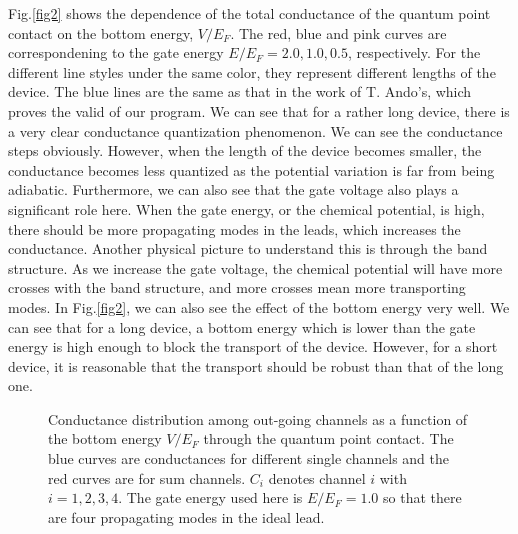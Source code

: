 \documentclass[journal]{IEEEtran}
\begin{document}
Fig.\ref{fig2} shows the dependence of the total conductance of the quantum point contact on the bottom energy,
$V/E_F$. The red, blue and pink curves are correspondening to the gate energy $E/E_F=2.0, 1.0, 0.5$, respectively. For
the different line styles under the same color, they represent different lengths of the device. The blue lines are the
same as that in the work of T. Ando's, which proves the valid of our program. We can see that for a rather long device,
there is a very clear conductance quantization phenomenon. We can see the conductance steps obviously. However, when the
length of the device becomes smaller, the conductance becomes less quantized as the potential variation is far from
being adiabatic. Furthermore, we can also see that the gate voltage also plays a significant role here. When the gate
energy, or the chemical potential, is high, there should be more propagating modes in the leads, which increases the
conductance. Another physical picture to understand this is through the band structure. As we increase the gate
voltage, the chemical potential will have more crosses with the band structure, and more crosses mean more transporting
modes.  In Fig.\ref{fig2}, we can also see the effect of the bottom energy very well. We can see that for a long device,
a bottom energy which is lower than the gate energy is high enough to block the transport of the device. However, for a
short device, it is reasonable that the transport should be robust than that of the long one.

\begin{figure}
    \centering
    \caption{Conductance distribution among out-going channels as a function of the bottom energy $V/E_F$ through the
    quantum point contact. The blue curves are conductances for different single channels and the red curves are for sum
channels. $C_i$ denotes channel $i$ with $i=1,2,3,4$. The gate energy used here is $E/E_F=1.0$ so that there are four
propagating modes in the ideal lead.}
    \label{fig3}
\end{figure}
\end{document}
